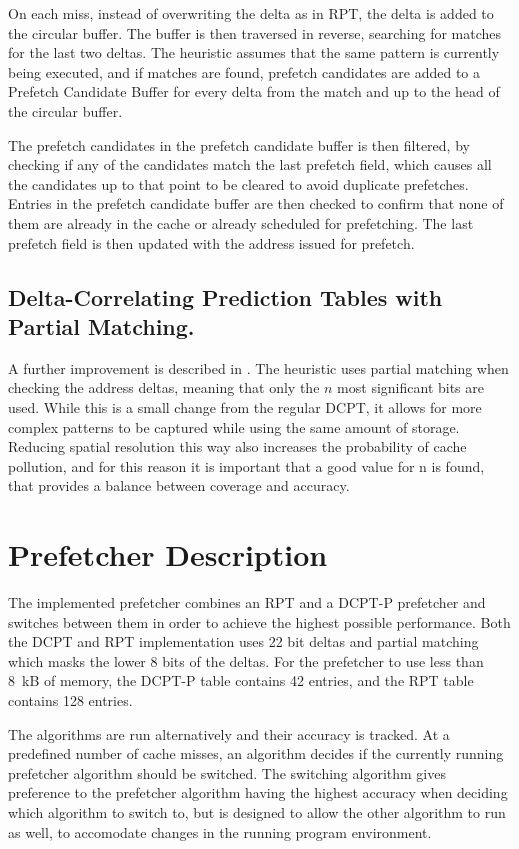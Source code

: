 \documentclass[journal,a4paper]{IEEEtran}
\begin{document}
On each miss, instead of overwriting the delta as in RPT, the delta is added to
the circular buffer. The buffer is then traversed in reverse, searching for
matches for the last two deltas. The heuristic assumes that the same pattern is currently being
executed, and if matches are found, prefetch candidates are added to a Prefetch Candidate
Buffer for every delta from the match and up to the head of the circular buffer.

The prefetch candidates in the prefetch candidate buffer is then filtered, by checking
if any of the candidates match the last prefetch field, which causes all the candidates
up to that point to be cleared to avoid duplicate prefetches. Entries in the prefetch
candidate buffer are then checked to confirm that none of them are already in the cache
or already scheduled for prefetching. The last prefetch field is then updated with the
address issued for prefetch\cite{dcpt}.

\subsection{Delta-Correlating Prediction Tables with Partial Matching.}
A further improvement is described in \cite{dcptp}. The heuristic uses partial matching
when checking the address deltas, meaning that only the $n$ most significant bits are used.
While this is a small change from the regular DCPT, it allows for more complex patterns
to be captured while using the same amount of storage. Reducing spatial resolution this way
also increases the probability of cache pollution, and for this reason it is important that
a good value for n is found, that provides a balance between coverage and accuracy.

\section{Prefetcher Description}
The implemented prefetcher combines an RPT and a DCPT-P prefetcher and
switches between them in order to achieve the highest possible performance.
Both the DCPT and RPT implementation uses 22 bit deltas and partial matching
which masks the lower 8 bits of the deltas. For the prefetcher to use less
than 8~kB of memory, the DCPT-P table contains 42 entries, and the RPT
table contains 128 entries.

The algorithms are run alternatively and their accuracy is tracked.
At a predefined number of cache misses, an algorithm decides if the
currently running prefetcher algorithm should be switched. The switching
algorithm gives preference to the prefetcher algorithm having the highest
accuracy when deciding which algorithm to switch to, but is designed to allow
the other algorithm to run as well, to accomodate changes in the running
program environment.
\end{document}
